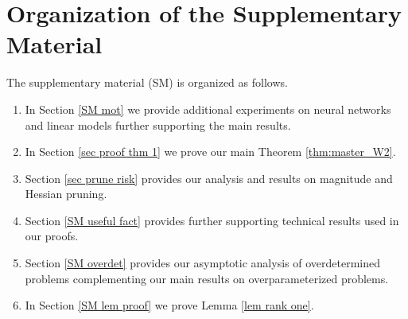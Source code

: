 \documentclass[letterpaper]{article} %
\begin{document}
\section*{Organization of the Supplementary Material}
The supplementary material (SM) 
is organized as follows. 
\begin{enumerate}
\item In Section \ref{SM mot} we provide additional experiments on neural networks and linear models further supporting the main results. 
\item In Section \ref{sec proof thm 1} we prove our main Theorem \ref{thm:master_W2}.
\item Section \ref{sec prune risk} provides our analysis and results on magnitude and Hessian pruning.
\item Section \ref{SM useful fact} provides further supporting technical results used in our proofs.
\item Section \ref{SM overdet} provides our asymptotic analysis of overdetermined problems complementing our main results on overparameterized problems. 
\item In Section \ref{SM lem proof} we prove Lemma \ref{lem rank one}. 
\end{enumerate}










\end{document}
